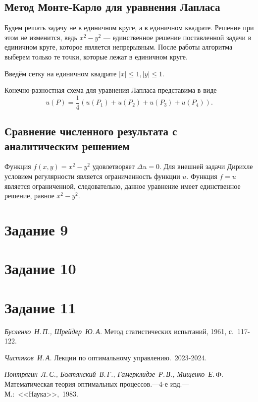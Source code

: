 \documentclass[11pt]{report}
\begin{document}
\subsection{Метод Монте-Карло для уравнения Лапласа}

Будем решать задачу не в единичном круге, а в единичном квадрате. Решение при этом не изменится, ведь $x^2-y^2$ --- единственное решение поставленной задачи в единичном круге, которое является непрерывным. После работы алгоритма выберем только те точки, которые лежат в единичном круге.

Введём сетку на единичном квадрате $|x|\leqslant1, |y|\leqslant1$.

Конечно-разностная схема для уравнения Лапласа представима в виде
$$
u(P) = \dfrac{1}{4}\left( u(P_1) + u(P_2) + u(P_3) + u(P_4) \right).
$$

\subsection{Сравнение численного результата с аналитическим решением}

Функция $f(x,y)=x^2-y^2$ удовлетворяет $\Delta u=0$. Для внешней задачи Дирихле условием регулярности является ограниченность функции $u$. Функция $f=u$ является ограниченной, следовательно, данное уравнение имеет единственное решение, равное $x^2-y^2$.

\section{Задание 9}

\section{Задание 10}

\section{Задание 11}

\begin{thebibliography}{99}

\textit{Бусленко~Н.\,П., Шрейдер~Ю.\,А.}
Метод статистических испытаний, 1961, с.~117-122.

\textit{Чистяков~И.\,А.}
Лекции по оптимальному управлению.~2023-2024.

\textit{Понтрягин~Л.\,С., Болтянский~В.\,Г., Гамерклидзе~Р.\,В., Мищенко~Е.\,Ф.}
Математическая теория оптимальных процессов.---4-е изд.---М.:~<<Наука>>,~1983.

\end{thebibliography}
\end{document}
